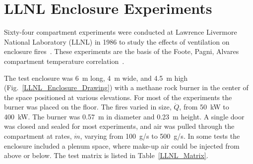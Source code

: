 \section{LLNL Enclosure Experiments}
\label{LLNL_Enclosure_Description}

Sixty-four compartment experiments were conducted at Lawrence Livermore National Laboratory (LLNL) in 1986 to study the effects of ventilation on enclosure fires~\cite{Foote:LLNL1986}. These experiments are the basis of the Foote, Pagni, Alvares compartment temperature correlation~\cite{Foote:IAFSS1}.

The test enclosure was 6~m long, 4~m wide, and 4.5~m high (Fig.~\ref{LLNL_Enclosure_Drawing}) with a methane rock burner in the center of the space positioned at various elevations. For most of the experiments the burner was placed on the floor. The fires varied in size, $\dot{Q}$, from 50~kW to 400~kW. The burner was 0.57~m in diameter and 0.23~m height. A single door was closed and sealed for most experiments, and air was pulled through the compartment at rates, $\dot{m}$, varying from 100~g/s to 500~g/s. In some tests the enclosure included a plenum space, where make-up air could be injected from above or below. The test matrix is listed in Table~\ref{LLNL_Matrix}.

